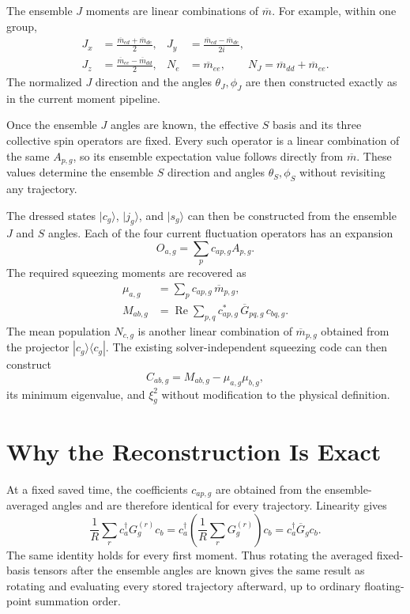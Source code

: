 \documentclass[11pt]{article}
\begin{document}
The ensemble $J$ moments are linear combinations of
$\overline{m}$.  For example, within one group,
\begin{align}
  J_x &= \frac{\overline{m}_{ed}+\overline{m}_{de}}{2},
  &
  J_y &= \frac{\overline{m}_{ed}-\overline{m}_{de}}{2i},
  \\
  J_z &= \frac{\overline{m}_{ee}-\overline{m}_{dd}}{2},
  &
  N_e &= \overline{m}_{ee},
  \qquad
  N_J = \overline{m}_{dd}+\overline{m}_{ee}.
\end{align}
The normalized $J$ direction and the angles $\theta_J,\phi_J$ are then
constructed exactly as in the current moment pipeline.

Once the ensemble $J$ angles are known, the effective $S$ basis and its three
collective spin operators are fixed.  Every such operator is a linear
combination of the same $A_{p,g}$, so its ensemble expectation value follows
directly from $\overline{m}$.  These values determine the ensemble $S$
direction and angles $\theta_S,\phi_S$ without revisiting any trajectory.

The dressed states $|c_g\rangle$, $|j_g\rangle$, and $|s_g\rangle$ can then be
constructed from the ensemble $J$ and $S$ angles.  Each of the four current
fluctuation operators has an expansion
\begin{equation}
  O_{a,g}=\sum_p c_{ap,g}A_{p,g}.
\end{equation}
The required squeezing moments are recovered as
\begin{align}
  \mu_{a,g}
  &= \sum_p c_{ap,g}\,\overline{m}_{p,g},
  \\
  M_{ab,g}
  &= \operatorname{Re}
  \sum_{p,q}
  c_{ap,g}^{*}\,\overline{G}_{pq,g}\,c_{bq,g}.
\end{align}
The mean population $N_{c,g}$ is another linear combination of
$\overline{m}_{p,g}$ obtained from the projector
$|c_g\rangle\langle c_g|$.  The existing solver-independent squeezing code
can then construct
\begin{equation}
  C_{ab,g}=M_{ab,g}-\mu_{a,g}\mu_{b,g},
\end{equation}
its minimum eigenvalue, and $\xi_g^2$ without modification to the physical
definition.

\section{Why the Reconstruction Is Exact}

At a fixed saved time, the coefficients $c_{ap,g}$ are obtained from the
ensemble-averaged angles and are therefore identical for every trajectory.
Linearity gives
\begin{equation}
  \frac{1}{R}\sum_r
  c_a^\dagger G_g^{(r)}c_b
  =
  c_a^\dagger
  \left(\frac{1}{R}\sum_r G_g^{(r)}\right)c_b
  =
  c_a^\dagger\overline{G}_g c_b.
\end{equation}
The same identity holds for every first moment.  Thus rotating the averaged
fixed-basis tensors after the ensemble angles are known gives the same result
as rotating and evaluating every stored trajectory afterward, up to ordinary
floating-point summation order.
\end{document}
